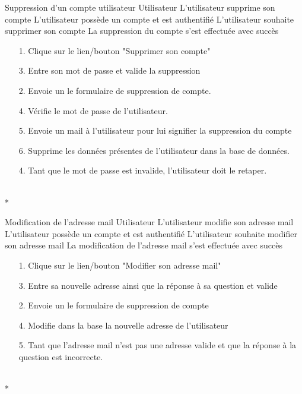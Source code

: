 \documentclass[a4paper,11pt,french]{article}
\begin{document}
\fiche
	{Suppression d'un compte utilisateur}
	{Utilisateur}
	{L'utilisateur supprime son compte}
	{L'utilisateur possède un compte et est authentifié}
	{L'utilisateur souhaite supprimer son compte}
	{La suppression du compte s'est effectuée avec succès}
	{\begin{itemize}
		\item[1.] Clique sur le lien/bouton "Supprimer son compte"
        \item[3.] Entre son mot de passe et valide la suppression
	\end{itemize}
	}
	{\begin{itemize}
        \item[]
		\item[2.] Envoie un le formulaire de suppression de compte.
		\item[4.] Vérifie le mot de passe de l'utilisateur.
        \item [5.] Envoie un mail à l'utilisateur pour lui signifier la
suppression du compte
	\item[6.] Supprime les données présentes de l'utilisateur dans la
base
         de données.
	\end{itemize}
	}
	{}
\flots
    {\begin{itemize}
    \item[]
    \item[4.] Tant que le mot de passe est invalide, l'utilisateur doit le
retaper.
    \end{itemize}
    }
	{}
\\*

\fiche
	{Modification de l'adresse mail}
	{Utilisateur}
	{L'utilisateur modifie son adresse mail}
	{L'utilisateur possède un compte et est authentifié}
	{L'utilisateur souhaite modifier son adresse mail}
	{La modification de l'adresse mail s'est effectuée avec succès}
	{\begin{itemize}
		\item[1.] Clique sur le lien/bouton "Modifier son adresse mail"
        \item[3.] Entre sa nouvelle adresse ainsi que la réponse à sa question
et valide
	\end{itemize}
	}
	{\begin{itemize}
        \item[]
		\item[2.] Envoie un le formulaire de suppression de compte
		\item[4.] Modifie dans la base la nouvelle adresse de l'utilisateur
	\end{itemize}
	}
	{}
\flots
    {\begin{itemize}
    \item[]
    \item[5.] Tant que l'adresse mail n'est pas une adresse valide et que la
réponse à la question est incorrecte.
    \end{itemize}
    }
	{}
\\*
\end{document}

